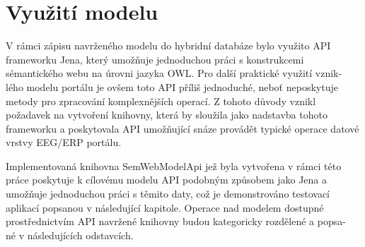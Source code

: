 \documentclass{projekt}
\begin{document}
\section{Využití modelu}
\hspace{0.65cm}V rámci zápisu navrženého modelu do hybridní databáze bylo využito API frameworku Jena, který umožňuje jednoduchou práci s konstrukcemi sémantického webu na úrovni jazyka OWL. Pro další praktické využití vznik-\\lého modelu portálu je ovšem toto API příliš jednoduché, neboť neposkytuje metody pro zpracování komplexnějších operací. Z tohoto důvody vznikl požadavek na vytvoření knihovny, která by sloužila jako nadstavba tohoto frameworku a poskytovala API umožňující snáze provádět typické operace datové vrstvy EEG/ERP portálu. 

Implementovaná knihovna SemWebModelApi jež byla vytvořena v rámci této práce poskytuje k cílovému modelu API podobným způsobem jako Jena a umožňuje jednoduchou práci s těmito daty, což je demonstrováno testovací aplikací popsanou v následující kapitole. Operace nad modelem dostupné prostřednictvím API navržené knihovny budou kategoricky rozdělené a popsa-\\né v následujících odstavcích.
\end{document}

